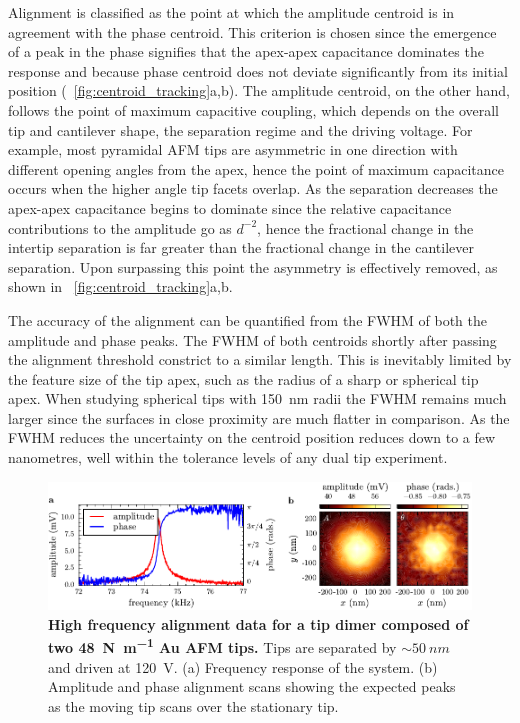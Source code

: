 \documentclass{article}
\begin{document}
Alignment is classified as the point at which the amplitude centroid is in agreement with the phase centroid. This criterion is chosen since the emergence of a peak in the phase signifies that the apex-apex capacitance dominates the response and because phase centroid does not deviate significantly from its initial position (\figurename~\ref{fig:centroid_tracking}a,b). The amplitude centroid, on the other hand, follows the point of maximum capacitive coupling, which depends on the overall tip and cantilever shape, the separation regime and the driving voltage. For example, most pyramidal AFM tips are asymmetric in one direction with different opening angles from the apex, hence the point of maximum capacitance occurs when the higher angle tip facets overlap. As the separation decreases the apex-apex capacitance begins to dominate since the relative capacitance contributions to the amplitude go as $d^{-2}$, hence the fractional change in the intertip separation is far greater than the fractional change in the cantilever separation. Upon surpassing this point the asymmetry is effectively removed, as shown in \figurename~\ref{fig:centroid_tracking}a,b.

The accuracy of the alignment can be quantified from the FWHM of both the amplitude and phase peaks. The FWHM of both centroids shortly after passing the alignment threshold constrict to a similar length. This is inevitably limited by the feature size of the tip apex, such as the radius of a sharp or spherical tip apex. When studying spherical tips with \SI{150}{nm} radii the FWHM remains much larger since the surfaces in close proximity are much flatter in comparison. As the FWHM reduces the uncertainty on the centroid position reduces down to a few nanometres, well within the tolerance levels of any dual tip experiment.

\begin{figure}[bt]
\centering
\includegraphics{figures/hf_alignment_data}
\caption[High frequency alignment data for a tip dimer composed of two \SI{48}{\newton\per\metre} Au AFM tips]{\textbf{High frequency alignment data for a tip dimer composed of two \SI{48}{\newton\per\metre} Au AFM tips.} Tips are separated by $\sim\SI{50}{nm}$ and driven at \SI{120}{V}. (a) Frequency response of the system. (b) Amplitude and phase alignment scans showing the expected peaks as the moving tip scans over the stationary tip.}
\label{fig:hf_alignment_data} 
\end{figure}
\end{document}
